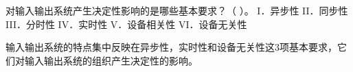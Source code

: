 \question 对输入输出系统产生决定性影响的是哪些基本要求？（ ）。 I．异步性
II．同步性 III．分时性 IV．实时性 V．设备相关性 VI．设备无关性
\par{}
\begin{solution}输入输出系统的特点集中反映在异步性，实时性和设备无关性这3项基本要求，它们对输入输出系统的组织产生决定性的影响。
\end{solution}
